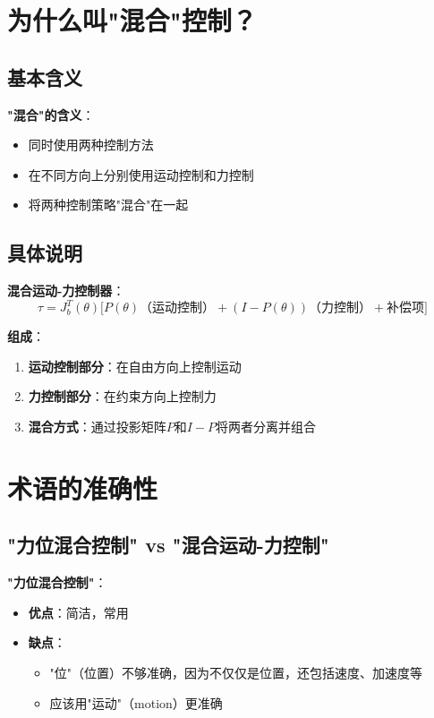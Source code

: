 \documentclass[12pt,a4paper]{article}
\begin{document}
\section{为什么叫"混合"控制？}

\subsection{基本含义}

\textbf{"混合"的含义}：
\begin{itemize}
\item 同时使用两种控制方法
\item 在不同方向上分别使用运动控制和力控制
\item 将两种控制策略"混合"在一起
\end{itemize}

\subsection{具体说明}

\textbf{混合运动-力控制器}：
\begin{equation}
\tau = J_b^T(\theta)\Bigg[P(\theta)\text{（运动控制）} + (I - P(\theta))\text{（力控制）} + \text{补偿项}\Bigg]
\end{equation}

\textbf{组成}：
\begin{enumerate}
\item \textbf{运动控制部分}：在自由方向上控制运动
\item \textbf{力控制部分}：在约束方向上控制力
\item \textbf{混合方式}：通过投影矩阵$P$和$I-P$将两者分离并组合
\end{enumerate}

\section{术语的准确性}

\subsection{"力位混合控制" vs "混合运动-力控制"}

\textbf{"力位混合控制"}：
\begin{itemize}
\item \textbf{优点}：简洁，常用
\item \textbf{缺点}：
\begin{itemize}
\item "位"（位置）不够准确，因为不仅仅是位置，还包括速度、加速度等
\item 应该用"运动"（motion）更准确
\end{itemize}
\end{itemize}
\end{document}
